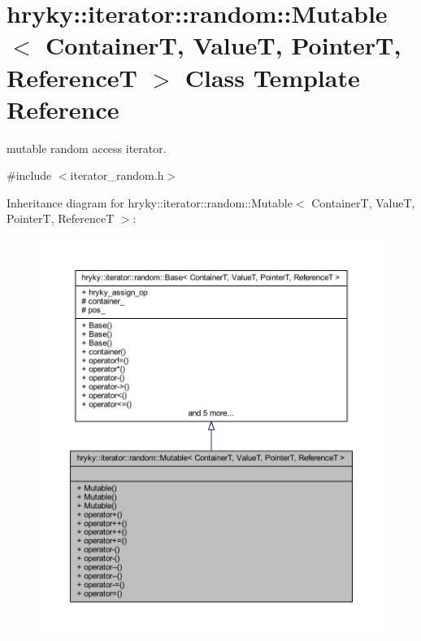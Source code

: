 \hypertarget{classhryky_1_1iterator_1_1random_1_1_mutable}{\section{hryky\-:\-:iterator\-:\-:random\-:\-:Mutable$<$ Container\-T, Value\-T, Pointer\-T, Reference\-T $>$ Class Template Reference}
\label{classhryky_1_1iterator_1_1random_1_1_mutable}
}


mutable random access iterator.  




{\ttfamily \#include $<$iterator\-\_\-random.\-h$>$}



Inheritance diagram for hryky\-:\-:iterator\-:\-:random\-:\-:Mutable$<$ Container\-T, Value\-T, Pointer\-T, Reference\-T $>$\-:
\nopagebreak
\begin{figure}[H]
\begin{center}
\leavevmode
\includegraphics[width=350pt]{classhryky_1_1iterator_1_1random_1_1_mutable__inherit__graph}
\end{center}
\end{figure}
